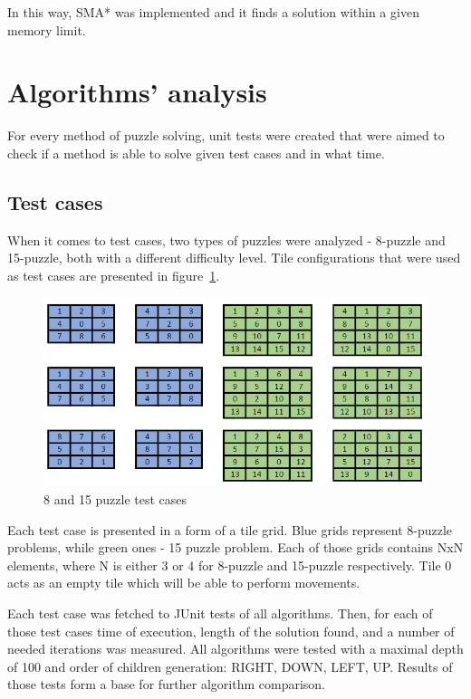 \documentclass[12pt]{article}
\begin{document}
In this way, SMA* was implemented and it finds a solution within a given memory limit.

\section{Algorithms' analysis}

For every method of puzzle solving, unit tests were created that were aimed to check if a method is able to solve given test cases and in what time.

\subsection {Test cases}

When it comes to test cases, two types of puzzles were analyzed - 8-puzzle and 15-puzzle, both with a different difficulty level. Tile configurations that were used as test cases are presented in figure~\ref{puzzle-test}.

\begin{figure}[h]
    \includegraphics[width=\textwidth]{puzzle_test}
    \centering
    \caption{8 and 15 puzzle test cases}
    \label {puzzle-test}
\end{figure}

Each test case is presented in a form of a tile grid. Blue grids represent 8-puzzle problems, while green ones - 15 puzzle problem. Each of those grids contains NxN elements, where N is either 3 or 4 for 8-puzzle and 15-puzzle respectively. Tile 0 acts as an empty tile which will be able to perform movements.

Each test case was fetched to JUnit tests of all algorithms. Then, for each of those test cases time of execution, length of the solution found, and a number of needed iterations was measured. All algorithms were tested with a maximal depth of 100 and order of children generation:  RIGHT, DOWN, LEFT, UP. Results of those tests form a base for further algorithm comparison.
\end{document}
